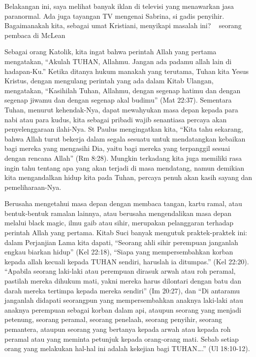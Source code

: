 
Belakangan ini, saya melihat banyak iklan di televisi yang menawarkan jasa paranormal. Ada juga tayangan TV mengenai Sabrina, si gadis penyihir. Bagaimanakah kita, sebagai umat Kristiani, menyikapi masalah ini?
~ seorang pembaca di McLean

Sebagai orang Katolik, kita ingat bahwa perintah Allah yang pertama mengatakan, “Akulah TUHAN, Allahmu. Jangan ada padamu allah lain di hadapan-Ku.” Ketika ditanya hukum manakah yang terutama, Tuhan kita Yesus Kristus, dengan mengulang perintah yang ada dalam Kitab Ulangan, mengatakan, “Kasihilah Tuhan, Allahmu, dengan segenap hatimu dan dengan segenap jiwamu dan dengan segenap akal budimu” (Mat 22:37). Sementara Tuhan, menurut kehendak-Nya, dapat mewahyukan masa depan kepada para nabi atau para kudus, kita sebagai pribadi wajib senantiasa percaya akan penyelenggaraan ilahi-Nya. St Paulus mengingatkan kita, “Kita tahu sekarang, bahwa Allah turut bekerja dalam segala sesuatu untuk mendatangkan kebaikan bagi mereka yang mengasihi Dia, yaitu bagi mereka yang terpanggil sesuai dengan rencana Allah” (Rm 8:28). Mungkin terkadang kita juga memiliki rasa ingin tahu tentang apa yang akan terjadi di masa mendatang, namun demikian kita mengandalkan hidup kita pada Tuhan, percaya penuh akan kasih sayang dan pemeliharaan-Nya.

Berusaha mengetahui masa depan dengan membaca tangan, kartu ramal, atau bentuk-bentuk ramalan lainnya, atau berusaha mengendalikan masa depan melalui black magic, ilmu gaib atau sihir, merupakan pelanggaran terhadap perintah Allah yang pertama. Kitab Suci banyak mengutuk praktek-praktek ini: dalam Perjanjian Lama kita dapati, “Seorang ahli sihir perempuan janganlah engkau biarkan hidup” (Kel 22:18), “Siapa yang mempersembahkan korban kepada allah kecuali kepada TUHAN sendiri, haruslah ia ditumpas.” (Kel 22:20). “Apabila seorang laki-laki atau perempuan dirasuk arwah atau roh peramal, pastilah mereka dihukum mati, yakni mereka harus dilontari dengan batu dan darah mereka tertimpa kepada mereka sendiri” (Im 20:27), dan “Di antaramu janganlah didapati seorangpun yang mempersembahkan anaknya laki-laki atau anaknya perempuan sebagai korban dalam api, ataupun seorang yang menjadi petenung, seorang peramal, seorang penelaah, seorang penyihir, seorang pemantera, ataupun seorang yang bertanya kepada arwah atau kepada roh peramal atau yang meminta petunjuk kepada orang-orang mati. Sebab setiap orang yang melakukan hal-hal ini adalah kekejian bagi TUHAN….” (Ul 18:10-12).

